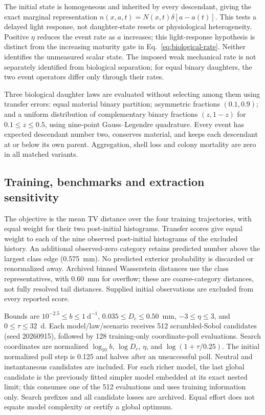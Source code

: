 The initial state is homogeneous and inherited by every descendant, giving the exact marginal representation $n(x,a,t)=N(x,t)\delta[a-a(t)]$. This tests a delayed light response, not daughter-state resets or physiological heterogeneity. Positive $\eta$ reduces the event rate as $a$ increases; this light-response hypothesis is distinct from the increasing maturity gate in Eq.~\eqref{eq:biological-rate}. Neither identifies the unmeasured scalar state. The imposed weak mechanical rate is not separately identified from biological separation; for equal binary daughters, the two event operators differ only through their rates.

Three biological daughter laws are evaluated without selecting among them using transfer errors: equal material binary partition; asymmetric fractions $(0.1,0.9)$; and a uniform distribution of complementary binary fractions $(z,1-z)$ for $0.1\leq z\leq0.5$, using nine-point Gauss--Legendre quadrature. Every event has expected descendant number two, conserves material, and keeps each descendant at or below its own parent. Aggregation, shell loss and colony mortality are zero in all matched variants.

\subsection{Training, benchmarks and extraction sensitivity}

The objective is the mean TV distance over the four training trajectories, with equal weight for their two post-initial histograms. Transfer scores give equal weight to each of the nine observed post-initial histograms of the excluded history. An additional observed-zero category retains predicted number above the largest class edge (0.575~mm). No predicted exterior probability is discarded or renormalized away. Archived binned Wasserstein distances use the class representatives, with 0.60~mm for overflow; these are coarse-category distances, not fully resolved tail distances. Supplied initial observations are excluded from every reported score.

Bounds are $10^{-2.5}\leq b\leq1~\mathrm{d^{-1}}$, $0.035\leq D_c\leq0.50$~mm, $-3\leq\eta\leq3$, and $0\leq\tau\leq32$~d. Each model/law/scenario receives 512 scrambled-Sobol candidates (seed 20260915), followed by 128 training-only coordinate-poll evaluations. Search coordinates are normalized $\log_{10}b$, $\log D_c$, $\eta$, and $\log(1+\tau/0.25)$. The initial normalized poll step is 0.125 and halves after an unsuccessful poll. Neutral and instantaneous candidates are included. For each richer model, the last global candidate is the previously fitted simpler model embedded at its exact nested limit; this consumes one of the 512 evaluations and uses training information only. Search prefixes and all candidate losses are archived. Equal effort does not equate model complexity or certify a global optimum.

